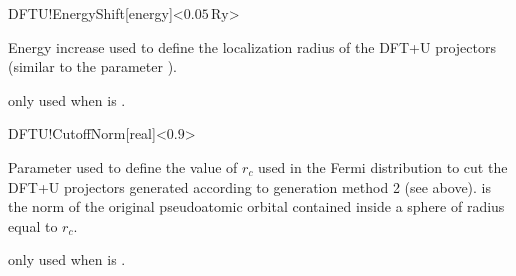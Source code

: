 \begin{fdfentry}{DFTU!EnergyShift}[energy]<$0.05\,\mathrm{Ry}$>

  Energy increase used to define the localization radius of the DFT+U
  projectors (similar to the parameter ).

  \note only used when  is .

\end{fdfentry}

\begin{fdfentry}{DFTU!CutoffNorm}[real]<$0.9$>

  Parameter used to define the value of $r_c$ used in the Fermi
  distribution to cut the DFT+U projectors generated according to
  generation method 2 (see above).  is the norm of the
  original pseudoatomic orbital contained inside a sphere of radius
  equal to $r_c$.

  \note only used when  is .

\end{fdfentry}


